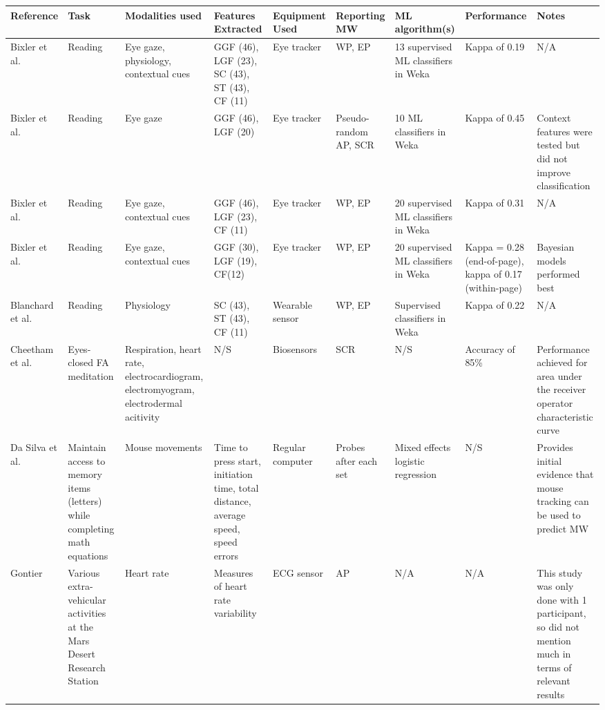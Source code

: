 \begin{xtabular}{p{25mm}p{30mm}p{30mm}p{22mm}p{38mm}p{22mm}p{33mm}p{22mm}p{35mm}}
  \toprule
        Reference & Task & Modalities used & Features Extracted \footnotemark[1] & Equipment Used & Reporting MW \footnotemark[2] & ML algorithm(s) & Performance & Notes\\
  \midrule
Bixler et al. \cite{Bixler2015AutomaticPhysiology} & Reading & Eye gaze, physiology, contextual cues & GGF (46), LGF (23), SC (43), ST (43), CF (11)  & Eye tracker & WP, EP & 13 supervised ML classifiers in Weka & Kappa of 0.19 & N/A \\
\midrule
Bixler et al. \cite{Bixler2015AutomaticAwareness} & Reading & Eye gaze & GGF (46), LGF (20) & Eye tracker & Pseudo-random AP, SCR & 10 ML classifiers in Weka & Kappa of 0.45 & Context features were tested but did not improve classification\\
\midrule
Bixler et al. \cite{Bixler2016AutomaticReadingd} & Reading & Eye gaze, contextual cues & GGF (46), LGF (23), CF (11) & Eye tracker & WP, EP & 20 supervised ML classifiers in Weka & Kappa of 0.31 & N/A \\
\midrule
Bixler et al. \cite{Bixler2014TowardWanderingd} & Reading & Eye gaze, contextual cues & GGF (30), LGF (19), CF(12) & Eye tracker & WP, EP & 20 supervised ML classifiers in Weka & Kappa = 0.28 (end-of-page), kappa of 0.17 (within-page) & Bayesian models performed best \\
\midrule
Blanchard et al. \cite{Blanchard2014AutomatedLearning} & Reading & Physiology & SC (43), ST (43), CF (11) & Wearable sensor & WP, EP & Supervised classifiers in Weka & Kappa of 0.22 & N/A \\
\midrule
Cheetham et al. \cite{Cheetham2016AutomatedApplication} & Eyes-closed FA meditation & Respiration, heart rate, electrocardiogram, electromyogram, electrodermal acitivity & N/S & Biosensors & SCR & N/S & Accuracy of 85\% & Performance achieved for area under the receiver operator characteristic curve\\
\midrule
Da Silva et al. \cite{DaSilva2018WanderingWandering} & Maintain access to memory items (letters) while completing math equations & Mouse movements & Time to press start, initiation time, total distance, average speed, speed errors & Regular computer & Probes after each set & Mixed effects logistic regression & N/S & Provides initial evidence that mouse tracking can be used to predict MW\\
\midrule
Gontier \cite{Gontier2016HowEnvironment} & Various extra-vehicular activities at the Mars Desert Research Station & Heart rate & Measures of heart rate variability & ECG sensor & AP & N/A & N/A & This study was only done with 1 participant, so did not mention much in terms of relevant results \\

\end{xtabular}
